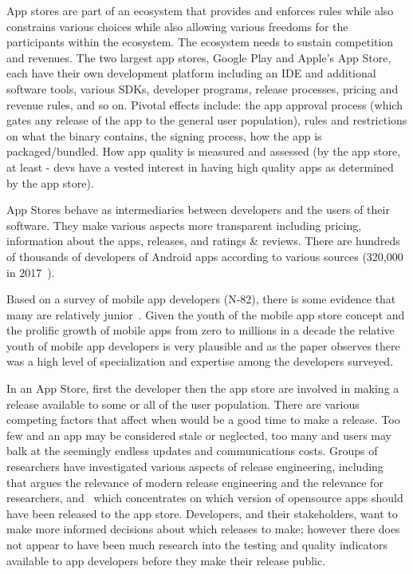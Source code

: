 App stores are part of an ecosystem that provides and enforces rules while also constrains various choices while also allowing various freedoms for the participants within the ecosystem. The ecosystem needs to sustain competition~ and revenues. The two largest app stores, Google Play and Apple's App Store, each have their own development platform including an IDE and additional software tools, various SDKs, developer programs, release processes, pricing and revenue rules, and so on. 
Pivotal effects include: the app approval process (which gates any release of the app to the general user population), rules and restrictions on what the binary contains, the signing process, how the app is packaged/bundled. How app quality is measured and assessed (by the app store, at least - devs have a vested interest in having high quality apps as determined by the app store).

App Stores behave as intermediaries between developers and the users of their software. They make various aspects more transparent including pricing, information about the apps, releases, and ratings \& reviews. There are hundreds of thousands of developers of Android apps according to various sources (320,000 in 2017~\cite{wang2017_exploratory_study_of_the_mobile_app_ecosystem}). 

Based on a survey of mobile app developers (N-82), there is some evidence that many are relatively junior~\cite[p. 142 and p.134]{francese2017_mobile_app_development_and_management_results_from_a_quantitative_investigation}. Given the youth of the mobile app store concept and the prolific growth of mobile apps from zero to millions in a decade the relative youth of mobile app developers is very plausible and as the paper observes there was a high level of specialization and expertise among the developers surveyed.

In an App Store, first the developer then the app store are involved in making a release available to some or all of the user population. There are various competing factors that affect when would be a good time to make a release. Too few and an app may be considered stale or neglected, too many and users may balk at the seemingly endless updates and communications costs. Groups of researchers have investigated various aspects of release engineering, including~ that argues the relevance of modern release engineering and the relevance for researchers, and~ which concentrates on which version of opensource apps should have been released to the app store. Developers, and their stakeholders, want to make more informed decisions about which releases to make; however there does not appear to have been much research into the testing and quality indicators available to app developers before they make their release public.


